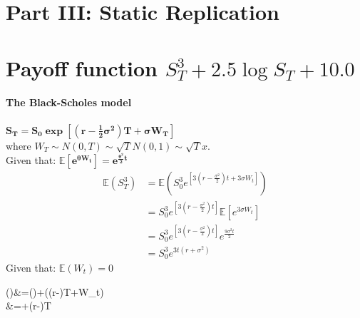 \documentclass{article}
\begin{document}
\section*{Part III: Static Replication}	
\setcounter{section}{0}
\section{Payoff function  $S^3_T+2.5 \log{S_T}+10.0 $}
\begin{minipage}[t]{0.5\textwidth}
	\begin{tcolorbox}[height=9cm,boxsep=5pt,arc=0pt,auto outer arc,colback=white,colframe=black]
		\noindent \textbf{The Black-Scholes model}\\ \\
		\noindent $\boldsymbol{S_T }\boldsymbol{= S_0 \exp\left[ \left(r-\frac{1}{2} \sigma^2 \right)T + \sigma W_T \right]}$\\ 
		where $W_T \sim N(0,T) \sim \sqrt{T} N(0,1) \sim \sqrt{T} x$.\\
		\noindent Given that: $\boldsymbol{\mathbb{E}[e^{\theta W_t}]=e^{\frac{\theta ^2}{2}t}}$ 
		\begin{align*}
		\mathbb{E}(S^3_T) &=\mathbb{E}(S^3_0 e^{[3(r-\frac{\sigma^2}{2})t+3\sigma W_t]})\\
		&=S^3_0 e^{[3(r-\frac{\sigma^2}{2})t]} \mathbb{E} [e^{3\sigma W_t}]\\
		&=S^3_0 e^{[3(r-\frac{\sigma^2}{2})t]} e^{\frac{9 \sigma^{2} t}{2}}\\
		&=S^3_0 e^{3t(r+\sigma^{2})}
		\end{align*}
		\noindent Given that: $\mathbb{E}(W_t)=0$
		\begin{flalign*}
		()&=()+((r-)T+\sigma W_t)\\
		&=+(r-)T
		\end{flalign*}
	\end{tcolorbox}
\end{minipage}
\end{document}
